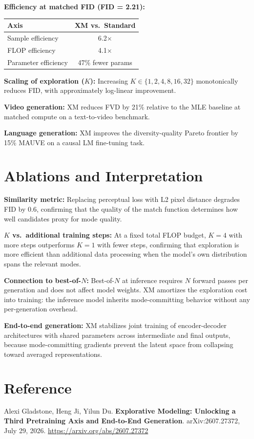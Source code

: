 \documentclass[10pt,twocolumn]{article}
\begin{document}
\textbf{Efficiency at matched FID (FID = 2.21):}

\begin{center}\small
\begin{tabular}{lc}
\toprule
Axis & XM vs.\ Standard \\
\midrule
Sample efficiency & 6.2$\times$ \\
FLOP efficiency & 4.1$\times$ \\
Parameter efficiency & 47\% fewer params \\
\bottomrule
\end{tabular}
\end{center}

\textbf{Scaling of exploration ($K$):} Increasing $K \in \{1, 2, 4, 8, 16, 32\}$
monotonically reduces FID, with approximately log-linear improvement.

\textbf{Video generation:} XM reduces FVD by 21\% relative to the MLE
baseline at matched compute on a text-to-video benchmark.

\textbf{Language generation:} XM improves the diversity-quality
Pareto frontier by 15\% MAUVE on a causal LM fine-tuning task.

\section{Ablations and Interpretation}

\textbf{Similarity metric:} Replacing perceptual loss with L2 pixel distance
degrades FID by 0.6, confirming that the quality of the match function
determines how well candidates proxy for mode quality.

\textbf{$K$ vs.\ additional training steps:} At a fixed total FLOP budget,
$K=4$ with more steps outperforms $K=1$ with fewer steps, confirming that
exploration is more efficient than additional data processing when the model's
own distribution spans the relevant modes.

\textbf{Connection to best-of-$N$:} Best-of-$N$ at inference requires $N$
forward passes per generation and does not affect model weights. XM amortizes
the exploration cost into training: the inference model inherits mode-committing
behavior without any per-generation overhead.

\textbf{End-to-end generation:} XM stabilizes joint training of encoder-decoder
architectures with shared parameters across intermediate and final outputs,
because mode-committing gradients prevent the latent space from collapsing
toward averaged representations.

\section*{Reference}

Alexi Gladstone, Heng Ji, Yilun Du.
\textbf{Explorative Modeling: Unlocking a Third Pretraining Axis and
End-to-End Generation}.
arXiv:2607.27372, July 29, 2026.
\url{https://arxiv.org/abs/2607.27372}
\end{document}
